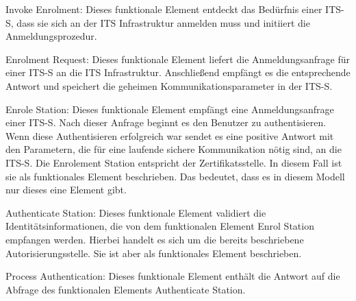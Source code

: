 Invoke Enrolment: Dieses funktionale Element entdeckt das Bedürfnis einer \ac{ITS-S}, dass sie sich an der \ac{ITS} Infrastruktur anmelden muss und initiiert die Anmeldungsprozedur.

Enrolment Request: Dieses funktionale Element liefert die Anmeldungsanfrage für einer \ac{ITS-S} an die \ac{ITS} Infrastruktur. Anschließend empfängt es die entsprechende Antwort und speichert die geheimen Kommunikationsparameter in der \ac{ITS-S}.


Enrole Station: Dieses funktionale Element empfängt eine Anmeldungsanfrage einer \ac{ITS-S}. Nach dieser Anfrage beginnt es den Benutzer zu authentisieren. Wenn diese Authentisieren erfolgreich war sendet es eine positive Antwort mit den Parametern, die für eine laufende sichere Kommunikation nötig sind, an die \ac{ITS-S}. Die Enrolement Station entspricht der Zertifikatsstelle. In diesem Fall ist sie als funktionales Element beschrieben. Das bedeutet, dass es in diesem Modell nur dieses eine Element gibt. 

Authenticate Station: Dieses funktionale Element validiert die Identitätsinformationen, die von dem funktionalen Element Enrol Station empfangen werden. Hierbei handelt es sich um die bereits beschriebene Autorisierungsstelle. Sie ist aber als funktionales Element beschrieben.

Process Authentication: Dieses funktionale Element enthält die Antwort auf die Abfrage des funktionalen Elements  Authenticate Station.

